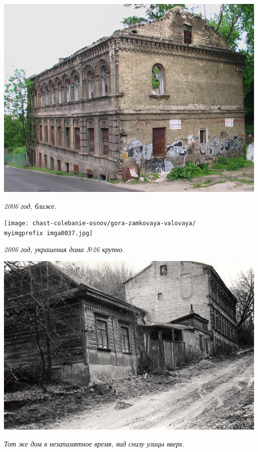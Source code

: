 \begin{center}
\includegraphics[width=\linewidth]{chast-colebanie-osnov/gora-zamkovaya-valovaya/imga0036.jpg}

\textit{2006 год, ближе.}
\end{center}

\newpage

\begin{center}
\texttt{[image: chast-colebanie-osnov/gora-zamkovaya-valovaya/\\myimgprefix imga0037.jpg]}

\textit{2006 год, украшения дома №26 крупно.}
\end{center}

\begin{center}
\includegraphics[width=\linewidth]{chast-colebanie-osnov/gora-zamkovaya-valovaya/vozn-2x.jpg}

\textit{Тот же дом в незапамятное время, вид снизу улицы вверх.}
\end{center}

